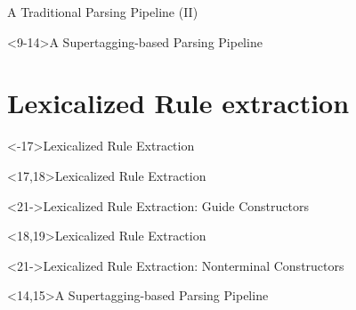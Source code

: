 \documentclass[aspectratio=169, 10pt]{beamer}
\begin{document}
    \begin{frame}{A Traditional Parsing Pipeline (II)}
        \centering
        
    \end{frame}

    \begin{frame}<9-14>{A Supertagging-based Parsing Pipeline \citep{bangalore1999supertagging}}
        \resizebox{\linewidth}{!}{}
    \end{frame}


    \section{Lexicalized Rule extraction}
    \begin{frame}<-17>{Lexicalized Rule Extraction \citep{Rup22}}
        \resizebox{\linewidth}{!}{}
    \end{frame}


    \begin{frame}<17,18>{Lexicalized Rule Extraction}
    \resizebox{\linewidth}{!}{}
    \end{frame}

    \begin{frame}<21->{Lexicalized Rule Extraction: Guide Constructors}
        \centering
        \resizebox{!}{.9\textheight}{}
    \end{frame}

    \begin{frame}<18,19>{Lexicalized Rule Extraction}
        \resizebox{\linewidth}{!}{}
    \end{frame}

    \begin{frame}<21->{Lexicalized Rule Extraction: Nonterminal Constructors}
        \resizebox{\linewidth}{!}{}
    \end{frame}


    \begin{frame}<14,15>{A Supertagging-based Parsing Pipeline}
        \resizebox{\linewidth}{!}{}
    \end{frame}
\end{document}
